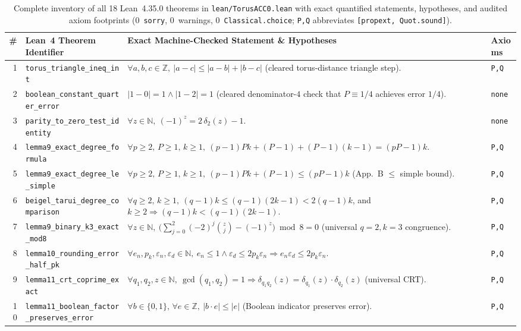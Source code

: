 \documentclass[10pt,twocolumn]{article}
\newcommand{\ZZ}{\mathbb{Z}}
\begin{document}
\begin{table}[t]
\centering
\caption{Complete inventory of all 18 Lean~4.35.0 theorems in \texttt{lean/TorusACC0.lean} with exact quantified statements, hypotheses, and audited axiom footprints (0~\texttt{sorry}, 0~warnings, 0~\texttt{Classical.choice}; \texttt{P,Q} abbreviates \texttt{[propext, Quot.sound]}).}
\label{tab:lean}
\scriptsize
\setlength{\tabcolsep}{2.8pt}
\begin{tabular}{@{}r l p{10.6cm} l@{}}
\toprule
\# & Lean~4 Theorem Identifier & Exact Machine-Checked Statement \& Hypotheses & Axioms \\
\midrule
1 & \texttt{torus\_triangle\_ineq\_int} & $\forall a,b,c\in\ZZ,\ |a-c| \le |a-b|+|b-c|$ (cleared torus-distance triangle step). & \texttt{P,Q} \\
2 & \texttt{boolean\_constant\_quarter\_error} & $|1-0|=1 \wedge |1-2|=1$ (cleared denominator-$4$ check that $P\equiv 1/4$ achieves error $1/4$). & \texttt{none} \\
3 & \texttt{parity\_to\_zero\_test\_identity} & $\forall z\in\mathbb{N},\ (-1)^z = 2\,\delta_2(z)-1$. & \texttt{none} \\
4 & \texttt{lemma9\_exact\_degree\_formula} & $\forall p\ge 2,\,P\ge 1,\,k\ge 1,\ (p{-}1)Pk + (P{-}1) + (P{-}1)(k{-}1) = (pP{-}1)k$. & \texttt{P,Q} \\
5 & \texttt{lemma9\_exact\_degree\_le\_simple} & $\forall p\ge 2,\,P\ge 1,\,k\ge 1,\ (p{-}1)Pk + (P{-}1) \le (pP{-}1)k$ (App.~B $\le$ simple bound). & \texttt{P,Q} \\
6 & \texttt{beigel\_tarui\_degree\_comparison} & $\forall q\ge 2,\,k\ge 1,\ (q{-}1)k \le (q{-}1)(2k{-}1) < 2(q{-}1)k$, and $k\ge 2 \Rightarrow (q{-}1)k < (q{-}1)(2k{-}1)$. & \texttt{P,Q} \\
7 & \texttt{lemma9\_binary\_k3\_exact\_mod8} & $\forall z\in\mathbb{N},\ \bigl(\sum_{j=0}^{2}(-2)^j\binom{z}{j} - (-1)^z\bigr) \bmod 8 = 0$ (universal $q=2,k=3$ congruence). & \texttt{P,Q} \\
8 & \texttt{lemma10\_rounding\_error\_half\_pk} & $\forall e_n,p_k,\varepsilon_n,\varepsilon_d\in\mathbb{N},\ e_n\le 1 \wedge \varepsilon_d\le 2 p_k \varepsilon_n \Rightarrow e_n \varepsilon_d \le 2 p_k \varepsilon_n$. & \texttt{P,Q} \\
9 & \texttt{lemma11\_crt\_coprime\_exact} & $\forall q_1,q_2,z\in\mathbb{N},\ \gcd(q_1,q_2)=1 \Rightarrow \delta_{q_1 q_2}(z) = \delta_{q_1}(z)\cdot\delta_{q_2}(z)$ (universal CRT). & \texttt{P,Q} \\
10 & \texttt{lemma11\_boolean\_factor\_preserves\_error} & $\forall b\in\{0,1\},\,\forall e\in\ZZ,\ |b\cdot e| \le |e|$ (Boolean indicator preserves error). & \texttt{P,Q} \\

\end{tabular}
\end{table}
\end{document}

